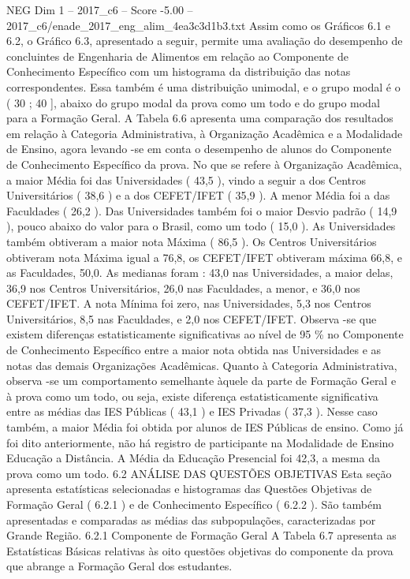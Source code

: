 \begin{textsample}{NEG Dim 1 – 2017\_c6 – Score -5.00 – 2017\_c6/enade\_2017\_eng\_alim\_4ea3c3d1b3.txt}
Assim como os Gráficos 6.1 e 6.2, o Gráfico 6.3, apresentado a seguir, permite uma avaliação do desempenho de concluintes de Engenharia de Alimentos em relação ao Componente de Conhecimento Específico com um histograma da distribuição das notas correspondentes.
Essa também é uma distribuição unimodal, e o grupo modal é o ( 30 ; 40 ], abaixo do grupo modal da prova como um todo e do grupo modal para a Formação Geral.
A Tabela 6.6 apresenta uma comparação dos resultados em relação à Categoria Administrativa, à Organização Acadêmica e a Modalidade de Ensino, agora levando -se em conta o desempenho de alunos do Componente de Conhecimento Específico da prova.
No que se refere à Organização Acadêmica, a maior Média foi das Universidades ( 43,5 ), vindo a seguir a dos Centros Universitários ( 38,6 ) e a dos CEFET/IFET ( 35,9 ).
A menor Média foi a das Faculdades ( 26,2 ).
Das Universidades também foi o maior Desvio padrão ( 14,9 ), pouco abaixo do valor para o Brasil, como um todo ( 15,0 ).
As Universidades também obtiveram a maior nota Máxima ( 86,5 ).
Os Centros Universitários obtiveram nota Máxima igual a 76,8, os CEFET/IFET obtiveram máxima 66,8, e as Faculdades, 50,0.
As medianas foram : 43,0 nas Universidades, a maior delas, 36,9 nos Centros Universitários, 26,0 nas Faculdades, a menor, e 36,0 nos CEFET/IFET.
A nota Mínima foi zero, nas Universidades, 5,3 nos Centros Universitários, 8,5 nas Faculdades, e 2,0 nos CEFET/IFET.
Observa -se que existem diferenças estatisticamente significativas ao nível de 95 \% no Componente de Conhecimento Específico entre a maior nota obtida nas Universidades e as notas das demais Organizações Acadêmicas.
Quanto à Categoria Administrativa, observa -se um comportamento semelhante àquele da parte de Formação Geral e à prova como um todo, ou seja, existe diferença estatisticamente significativa entre as médias das IES Públicas ( 43,1 ) e IES Privadas ( 37,3 ).
Nesse caso também, a maior Média foi obtida por alunos de IES Públicas de ensino.
Como já foi dito anteriormente, não há registro de participante na Modalidade de Ensino Educação a Distância.
A Média da Educação Presencial foi 42,3, a mesma da prova como um todo. 6.2 ANÁLISE DAS QUESTÕES OBJETIVAS Esta seção apresenta estatísticas selecionadas e histogramas das Questões Objetivas de Formação Geral ( 6.2.1 ) e de Conhecimento Específico ( 6.2.2 ).
São também apresentadas e comparadas as médias das subpopulações, caracterizadas por Grande Região. 6.2.1 Componente de Formação Geral A Tabela 6.7 apresenta as Estatísticas Básicas relativas às oito questões objetivas do componente da prova que abrange a Formação Geral dos estudantes.

\end{textsample}
